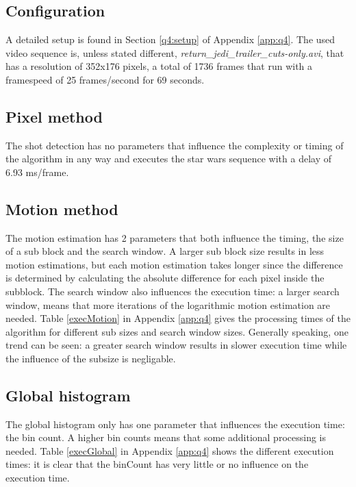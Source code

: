 \section[A comparative discussion of the computational complexity of each video shot detection method, taking into account different parameter settings. Provide information about the PC configuration used in order to put the time measurements in context.]{}

\subsection{Configuration}
A detailed setup is found in Section \ref{q4:setup} of Appendix \ref{app:q4}. The used video sequence is, unless stated different, \emph{return\_jedi\_trailer\_cuts-only.avi}, that has a resolution of 352x176 pixels, a total of 1736 frames that run with a framespeed of 25 frames/second for 69 seconds.
\\
\subsection{Pixel method}
The shot detection has no parameters that influence the complexity or timing of the algorithm in any way and executes the star wars sequence with a delay of 6.93 ms/frame. 
\\
\subsection{Motion method}
The motion estimation has 2 parameters that both influence the timing, the size of a sub block and the search window. A larger sub block size results in less motion estimations, but each motion estimation takes longer since the difference is determined by calculating the absolute difference for each pixel inside the subblock. The search window also influences the execution time: a larger search window, means that more iterations of the logarithmic motion estimation are needed. Table \ref{execMotion} in Appendix \ref{app:q4} gives the processing times of the algorithm for different sub sizes and search window sizes. Generally speaking, one trend can be seen: a greater search window results in slower execution time while the influence of the subsize is negligable.
\\
\subsection{Global histogram}
The global histogram only has one parameter that influences the execution time: the bin count. A higher bin counts means that some additional processing is needed. Table \ref{execGlobal} in Appendix \ref{app:q4} shows the different execution times: it is clear that the binCount has very little or no influence on the execution time.
\\
